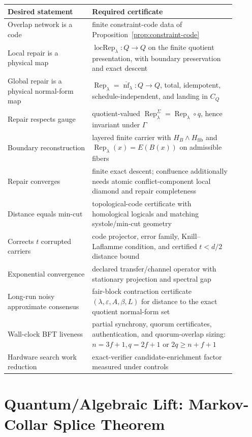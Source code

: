 \documentclass[11pt]{article}
\theoremstyle{remark}
\theoremstyle{plain}
\begin{document}
\begin{center}
\small
\begin{tabular}{@{}p{0.33\linewidth}p{0.56\linewidth}@{}}
\textbf{Desired statement} & \textbf{Required certificate} \\
\hline
Overlap network is a code & finite constraint-code data of Proposition~\ref{prop:constraint-code} \\
Local repair is a physical map & \(\operatorname{locRep}_\lambda:Q\to Q\) on the finite quotient presentation, with boundary preservation and exact descent \\
Global repair is a physical normal-form map & \(\operatorname{Rep}_\lambda=\overline{\operatorname{nf}}_\lambda:Q\to Q\), total, idempotent, schedule-independent, and landing in \(C_Q\) \\
Repair respects gauge & quotient-valued \(\operatorname{Rep}^{\Sigma}_\lambda=\operatorname{Rep}_\lambda\circ q\), hence invariant under \(\Gamma\) \\
Boundary reconstruction & layered finite carrier with \(H_B\wedge H_{\mathrm{fib}}\) and \(\operatorname{Rep}_\lambda(x)=E(B(x))\) on admissible fibers \\
Repair converges & finite exact descent; confluence additionally needs atomic conflict-component local diamond and repair completeness \\
Distance equals min-cut & topological-code certificate with homological logicals and matching systole/min-cut geometry \\
Corrects \(t\) corrupted carriers & code projector, error family, Knill--Laflamme condition, and certified \(t<d/2\) distance bound \\
Exponential convergence & declared transfer/channel operator with stationary projection and spectral gap \\
Long-run noisy approximate consensus & fair-block contraction certificate \((\lambda,\varepsilon,A,\beta,L)\) for distance to the exact quotient normal-form set \\
Wall-clock BFT liveness & partial synchrony, quorum certificates, authentication, and quorum-overlap sizing: \(n=3f+1,q=2f+1\) or \(2q\ge n+f+1\) \\
Hardware search work reduction & exact-verifier candidate-enrichment factor measured under controls \\
\end{tabular}
\end{center}


\appendix
\section{Quantum/Algebraic Lift: Markov-Collar Splice Theorem}\label{app:splice}
\end{document}

